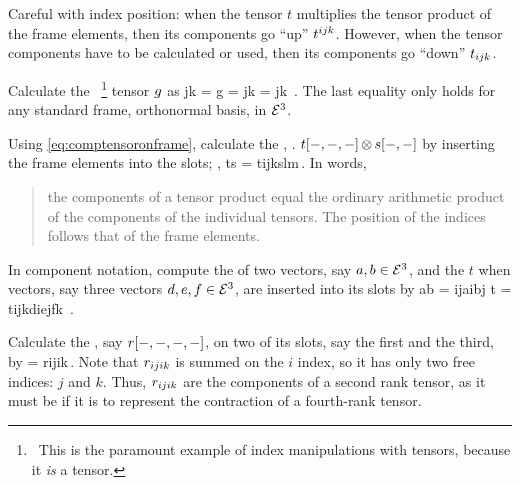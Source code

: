 \begin{remark}
Careful with index position: when the tensor $t$ multiplies the tensor product of the frame elements, then its components go ``up'' ${t}^{ijk}$. However, when the tensor components have to be calculated or used, then its components go ``down'' ${t}_{ijk}$.
\end{remark}

Calculate the ~\footnote{~This is the paramount example of index manipulations with tensors, because it \emph{is} a tensor.} tensor $g$ as
\beq
\imet jk = g = \nbvec j\iprod\nbvec k = \ikron jk \,.
\eeq
The last equality only holds for any standard frame, \aka orthonormal basis, in $\mathcal{E}^{3}$.

Using \cref{eq:comptensoronframe}, calculate the , \eg. $t\!\left[{-,-,-}\right]\operatorname{\otimes} s\!\left[{-,-}\right]$ by inserting the frame elements into the slots; \ie,
\beq
t\tprod s 
    = \cotens t{ijk}\cotens s{lm}\,.
\eeq
In words, 
\begin{quote}
the components of a tensor product equal the ordinary arithmetic product of the components of the individual tensors. The position of the indices follows that of the frame elements.
\end{quote}

In component notation, compute the  of two vectors, say $a,b\in\mathcal{E}^{3}$, and the  $t$ when vectors, say three vectors $d,e,f\in\mathcal{E}^{3}$, are inserted into its slots by
\beq
   a\iprod b = \imet ij\cnvec ai\cnvec bj \qquad 
t = \cotens t{ijk}\cnvec di\cnvec ej\cnvec fk \,.
\eeq

Calculate the , say $r\!\left[{-,-,-,-}\right]$, on two of its slots, say the first and the third, by
\beq
{} = \cotens r{ijik}\,.
\eeq
Note that ${r}_{ijik}$ is summed on the $i$ index, so it has only two free indices: $j$ and $k$. Thus, ${r}_{ijik}$ are the components of a second rank tensor, as it must be if it is to represent the contraction of a fourth-rank tensor.
